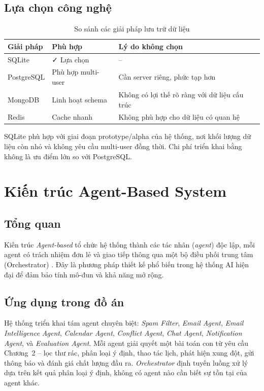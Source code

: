 \documentclass[../DoAn.tex]{subfiles}
\begin{document}
\subsection{Lựa chọn công nghệ}

\begin{table}[ht]
\centering
\caption{So sánh các giải pháp lưu trữ dữ liệu}
\label{tab:db-comparison}
\begin{tabular}{|l|l|l|}
\hline
\textbf{Giải pháp} & \textbf{Phù hợp} & \textbf{Lý do không chọn} \\
\hline
SQLite & ✓ Lựa chọn & -- \\
PostgreSQL & Phù hợp multi-user & Cần server riêng, phức tạp hơn \\
MongoDB & Linh hoạt schema & Không có lợi thế rõ ràng với dữ liệu cấu trúc \\
Redis & Cache nhanh & Không phù hợp cho dữ liệu có quan hệ \\
\hline
\end{tabular}
\end{table}

SQLite phù hợp với giai đoạn prototype/alpha của hệ thống, nơi khối lượng dữ liệu còn nhỏ và không yêu cầu multi-user đồng thời. Chi phí triển khai bằng không là ưu điểm lớn so với PostgreSQL.

\section{Kiến trúc Agent-Based System}

\subsection{Tổng quan}

Kiến trúc \textit{Agent-based} tổ chức hệ thống thành các tác nhân (\textit{agent}) độc lập, mỗi agent có trách nhiệm đơn lẻ và giao tiếp thông qua một bộ điều phối trung tâm (Orchestrator) \cite{wooldridge1995intelligent}. Đây là phương pháp thiết kế phổ biến trong hệ thống AI hiện đại để đảm bảo tính mô-đun và khả năng mở rộng.

\subsection{Ứng dụng trong đồ án}

Hệ thống triển khai tám agent chuyên biệt: \textit{Spam Filter}, \textit{Email Agent}, \textit{Email Intelligence Agent}, \textit{Calendar Agent}, \textit{Conflict Agent}, \textit{Chat Agent}, \textit{Notification Agent}, và \textit{Evaluation Agent}. Mỗi agent giải quyết một bài toán con từ yêu cầu Chương~2 -- lọc thư rác, phân loại ý định, thao tác lịch, phát hiện xung đột, gửi thông báo và đánh giá chất lượng đầu ra. \textit{Orchestrator} định tuyến luồng xử lý dựa trên kết quả phân loại ý định, không có agent nào cần biết sự tồn tại của agent khác.
\end{document}
